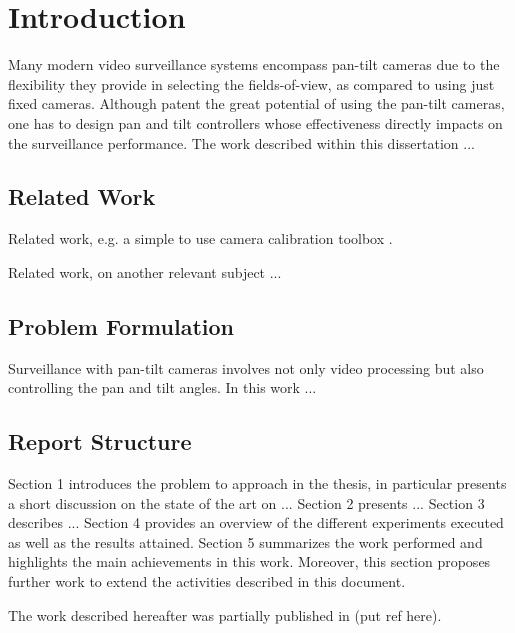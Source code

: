 \section{Introduction}

Many modern video surveillance systems encompass pan-tilt cameras due to the flexibility they provide in selecting the fields-of-view, as compared to using just fixed cameras. Although patent the great potential of using the pan-tilt cameras, one has to design pan and tilt controllers whose effectiveness directly impacts on the surveillance performance.
%
The work described within this dissertation ...


\subsection{Related Work} 

Related work, e.g. a simple to use camera calibration toolbox \cite{Bouguet}.

Related work, on another relevant subject ...


\subsection{Problem Formulation} 


Surveillance with pan-tilt cameras involves not only video processing but also controlling the pan and tilt angles. In this work ...


\subsection{Report Structure} 

Section 1 introduces the problem to approach in the thesis, in particular presents a short discussion on the state of the art on ... 
%
Section 2 presents ...
%
Section 3 describes ...
%
Section 4 provides an overview of the different experiments executed as well as the results attained.
%
Section 5 summarizes the work performed and highlights the main achievements in this work. Moreover, this section proposes further work to extend the activities described in this document.

The work described hereafter was partially published in (put ref here).
